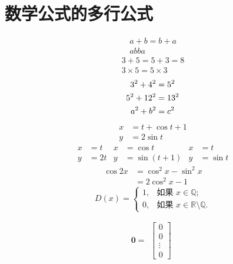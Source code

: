 \documentclass[12pt]{ctexbook}  %
\begin{document}
	\chapter{数学公式的多行公式}
	\begin{gather}
		a + b = b + a \\
		ab  ba
	\end{gather}
	\begin{gather*}
		3 + 5 = 5 + 3 =8 \\
		3 \times 5 = 5 \times 3
	\end{gather*}
	\begin{gather}
		3^2 + 4^2 = 5^2 \notag \\
		5^2 + 12^2 = 13^2 \notag \\
		a^2 + b^2 = c^2
	\end{gather}
	\begin{align}
		x &= t + \cos t + 1 \\
		y &= 2\sin t
	\end{align}
	\begin{align*}
		x &= t & x &= \cos t & x &= t \\
		y &= 2t & y &= \sin(t+1) & y &= \sin t
	\end{align*}
	\begin{equation}
	\begin{split}
		\cos 2x &= \cos^2 x - \sin^2 x \\
		&= 2\cos^2 x - 1
	\end{split}
	\end{equation}
	\begin{equation}
		D(x) = \begin{cases}
			1, & \text{如果 } x \in \mathbb{Q}; \\
			0, & \text{如果 } x \in \mathbb{R}\setminus\mathbb{Q}.
		\end{cases}
	\end{equation}

$$\textbf{0}= \begin{aligned}
	\begin{bmatrix}
		0 \\0  \\ \vdots \\ 0
	\end{bmatrix}
\end{aligned}$$ 
\end{document}
